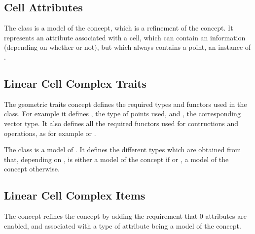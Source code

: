 \subsection{Cell Attributes}\label{ssec-attribute-wp}

The
class is a model of the  concept, which is
a refinement of the  concept. It represents an
attribute associated with a cell, which can contain an information
(depending on whether  or not), but which always
contains a point, an instance of .


\subsection{Linear Cell Complex Traits}\label{ssec-lcc-traits}

The  geometric traits concept defines the
required types and functors used in the 
class. For example it defines , the type of points used,
and , the corresponding vector type.  It also defines all
the required functors used for contructions and operations, as for
example  or
.

The class  is a model of
. It defines the different types which
are obtained from  that, depending on , is either a model of
the concept  if  or , a model of the
concept  otherwise.


\subsection{Linear Cell Complex Items}\label{ssec-lcc-item}

The  concept refines the
 concept by adding the requirement that
0-attributes are enabled, and associated with a type of attribute
being a model of the  concept.  

